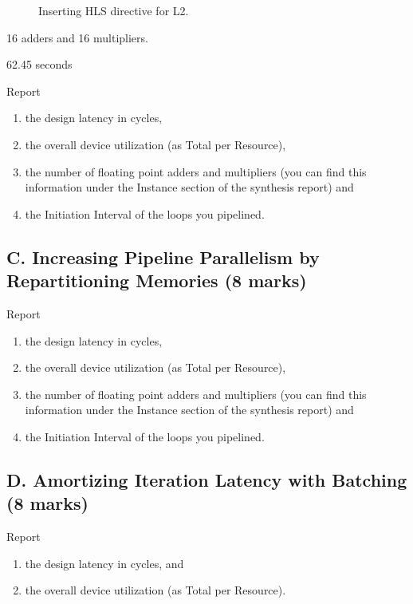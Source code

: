 \begin{figure}[h!]
    \centering
    \inputminted{diff}{program/diff.L2}
    \caption{Inserting HLS directive for L2.}\label{fig:float-diff.L2}
\end{figure}

16 adders and 16 multipliers.

62.45 seconds

Report
\begin{enumerate}
    \item the design latency in cycles,
    \item the overall device utilization (as Total per Resource),
    \item the number of floating point adders and multipliers
          (you can find this information under the Instance section of the synthesis report) and
    \item the Initiation Interval of the loops you pipelined.
\end{enumerate}

\subsection{C. Increasing Pipeline Parallelism by Repartitioning Memories (8 marks)}

Report
\begin{enumerate}
    \item the design latency in cycles,
    \item the overall device utilization (as Total per Resource),
    \item the number of floating point adders and multipliers (you can find this information under the Instance section of the synthesis report) and
    \item the Initiation Interval of the loops you pipelined.
\end{enumerate}

\subsection{D. Amortizing Iteration Latency with Batching (8 marks)}

Report \begin{enumerate}
    \item the design latency in cycles, and
    \item the overall device utilization (as Total per Resource).
\end{enumerate}

